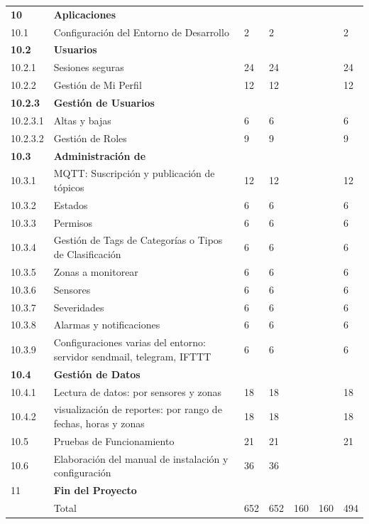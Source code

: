 \documentclass[11pt]{charter}
\begin{document}
\begin{landscape}
\begin{tabularx}{\linewidth}{@{}|p{1.5cm}|p{13cm}|p{1.5cm}|p{1.5cm}|p{1.5cm}|p{1.5cm}|p{1.5cm}|@{}}
\textbf{10} & \textbf{Aplicaciones} &  &  &  &  &  \\
10.1 & Configuración del Entorno de Desarrollo & 2 & 2 &  &  & 2 \\
\textbf{10.2} & \textbf{Usuarios} & \textbf{} & \textbf{} &  &  & \textbf{} \\
10.2.1 & Sesiones seguras & 24 & 24 &  &  & 24 \\
10.2.2 & Gestión de Mi Perfil & 12 & 12 &  &  & 12 \\
\textbf{10.2.3} & \textbf{Gestión de Usuarios} &  &  &  &  &  \\
10.2.3.1 & Altas y bajas & 6 & 6 &  &  & 6 \\
10.2.3.2 & Gestión de Roles & 9 & 9 &  &  & 9 \\
\textbf{10.3} & \textbf{Administración de} &  &  &  &  &  \\
10.3.1 & MQTT: Suscripción y   publicación de tópicos & 12 & 12 &  &  & 12 \\
10.3.2 & Estados & 6 & 6 &  &  & 6 \\
10.3.3 & Permisos & 6 & 6 &  &  & 6 \\
10.3.4 & Gestión de Tags de Categorías   o Tipos de Clasificación & 6 & 6 &  &  & 6 \\
10.3.5 & Zonas a monitorear & 6 & 6 &  &  & 6 \\
10.3.6 & Sensores & 6 & 6 &  &  & 6 \\
10.3.7 & Severidades & 6 & 6 &  &  & 6 \\
10.3.8 & Alarmas y notificaciones & 6 & 6 &  &  & 6 \\
10.3.9 & Configuraciones varias del   entorno: servidor sendmail, telegram, IFTTT & 6 & 6 &  &  & 6 \\
\textbf{10.4} & \textbf{Gestión de Datos} &  &  &  &  &  \\
10.4.1 & Lectura de datos: por   sensores y zonas & 18 & 18 &  &  & 18 \\
10.4.2 & visualización de reportes: por rango de fechas, horas y zonas & 18 & 18 &  &  & 18 \\
10.5 & Pruebas de Funcionamiento & 21 & 21 &  &  & 21 \\
10.6 & Elaboración del manual de instalación y configuración & 36 & 36 &  &  &  \\
11 & \textbf{Fin del Proyecto} &  &  &  &  & \\ \hline
  & Total & 652 & 652 & 160 & 160 & 494 \\ \hline

\end{tabularx}
\end{landscape}
\end{document}
